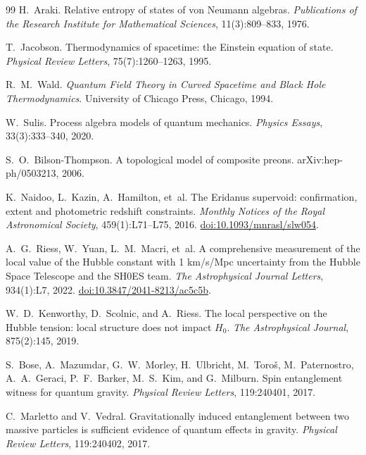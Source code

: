 \documentclass[11pt,a4paper]{article}
\theoremstyle{plain}
\theoremstyle{definition}
\theoremstyle{remark}
\begin{document}
\begin{thebibliography}{99}
H.~Araki.
\newblock Relative entropy of states of von {Neumann} algebras.
\newblock \textit{Publications of the Research Institute for Mathematical
  Sciences}, 11(3):809--833, 1976.

T.~Jacobson.
\newblock Thermodynamics of spacetime: the {Einstein} equation of state.
\newblock \textit{Physical Review Letters}, 75(7):1260--1263, 1995.

R.~M.~Wald.
\newblock \textit{Quantum Field Theory in Curved Spacetime and Black Hole
  Thermodynamics}.
\newblock University of Chicago Press, Chicago, 1994.

W.~Sulis.
\newblock Process algebra models of quantum mechanics.
\newblock \textit{Physics Essays}, 33(3):333--340, 2020.

S.~O.~Bilson-Thompson.
\newblock A topological model of composite preons.
\newblock arXiv:hep-ph/0503213, 2006.

K.~Naidoo, L.~Kazin, A.~Hamilton, et~al.
\newblock The Eridanus supervoid: confirmation, extent and photometric redshift
  constraints.
\newblock \emph{Monthly Notices of the Royal Astronomical Society},
  459(1):L71--L75, 2016.
\newblock \href{https://doi.org/10.1093/mnrasl/slw054}{doi:10.1093/mnrasl/slw054}.

A.~G.~Riess, W.~Yuan, L.~M.~Macri, et~al.
\newblock A comprehensive measurement of the local value of the Hubble constant
  with 1 km/s/Mpc uncertainty from the Hubble Space Telescope and the
  {SH0ES} team.
\newblock \emph{The Astrophysical Journal Letters}, 934(1):L7, 2022.
\newblock \href{https://doi.org/10.3847/2041-8213/ac5c5b}{doi:10.3847/2041-8213/ac5c5b}.

W.~D.~Kenworthy, D.~Scolnic, and A.~Riess.
\newblock The local perspective on the {Hubble} tension: local structure does
  not impact $H_0$.
\newblock \textit{The Astrophysical Journal}, 875(2):145, 2019.

S.~Bose, A.~Mazumdar, G.~W.~Morley, H.~Ulbricht, M.~Toro\v{s},
  M.~Paternostro, A.~A.~Geraci, P.~F.~Barker, M.~S.~Kim, and G.~Milburn.
\newblock Spin entanglement witness for quantum gravity.
\newblock \textit{Physical Review Letters}, 119:240401, 2017.

C.~Marletto and V.~Vedral.
\newblock Gravitationally induced entanglement between two massive particles is
  sufficient evidence of quantum effects in gravity.
\newblock \textit{Physical Review Letters}, 119:240402, 2017.


\end{thebibliography}
\end{document}
